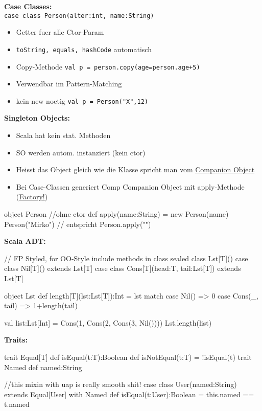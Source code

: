 \begin{breakbox}
\textbf{Case Classes:}\\
\texttt{case class Person(alter:int, name:String)}
\begin{itemize}
	\item Getter fuer alle Ctor-Param
	\item \texttt{toString, equals, hashCode} automatisch
	\item Copy-Methode \texttt{val p = person.copy(age=person.age+5)}
	\item Verwendbar im Pattern-Matching
	\item kein new noetig \texttt{val p = Person("X",12)}
\end{itemize}
\end{breakbox}

\begin{breakbox}
\textbf{Singleton Objects:}\\
\begin{itemize}
	\item Scala hat kein stat. Methoden
	\item SO werden autom. instanziert (kein ctor)
	\item Heisst das Object gleich wie die Klasse spricht man vom \underline{Companion Object}
	\item Bei Case-Classen generiert Comp Companion Object mit apply-Methode (\underline{Factory!})
\end{itemize}
\begin{scalacode}
object Person { //ohne ctor
	def apply(name:String) = new Person(name)
}
Person("Mirko") // entspricht Person.apply("")
\end{scalacode}
\end{breakbox}

\begin{breakbox}
\textbf{Scala ADT:}\\
\begin{scalacode}
// FP Styled, for OO-Style include methods in class
sealed class Lst[T]()
case class Nil[T]() extends Lst[T]
case class Cons[T](head:T, tail:Lst[T]) extends Lst[T]

object Lst {
  def length[T](lst:Lst[T]):Int = {
    lst match {
      case Nil() => 0
      case Cons(_, tail) => 1+length(tail)
    }
  }
}

val list:Lst[Int] = Cons(1, Cons(2, Cons(3, Nil())))
Lst.length(list)
\end{scalacode}
\end{breakbox}

\begin{breakbox}
\textbf{Traits:}\\
\begin{scalacode}
trait Equal[T] {
  def isEqual(t:T):Boolean
  def isNotEqual(t:T) = !isEqual(t)
}
trait Named { def named:String }

//this mixin with uap is really smooth shit!
case class User(named:String) extends Equal[User] with Named {
  def isEqual(t:User):Boolean = this.named == t.named
}
\end{scalacode}
\end{breakbox}


